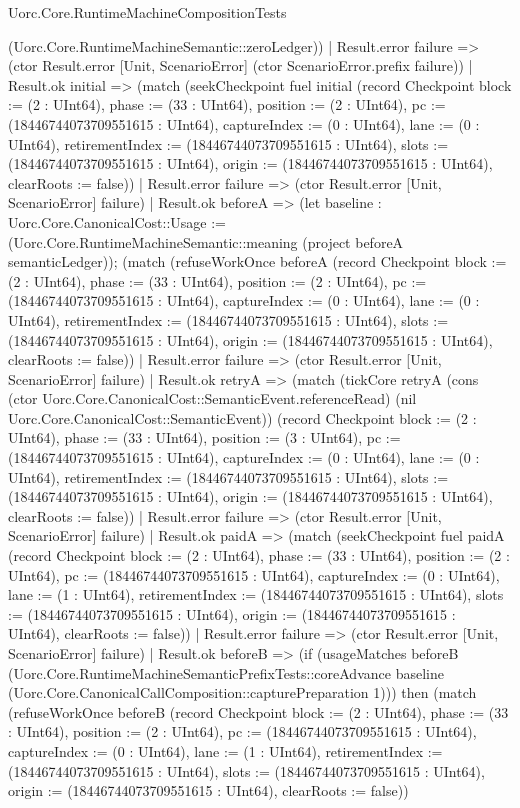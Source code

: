 \begin{lexlean}{Uorc.Core.RuntimeMachineCompositionTests}
\begin{semanticmodule}
{(Uorc.Core.RuntimeMachineSemantic::zeroLedger))
    | Result.error failure => (ctor Result.error [Unit, ScenarioError] (ctor ScenarioError.prefix failure))
    | Result.ok initial => (match (seekCheckpoint fuel initial (record Checkpoint {block := (2 : UInt64), phase := (33 : UInt64), position := (2 : UInt64), pc := (18446744073709551615 : UInt64), captureIndex := (0 : UInt64), lane := (0 : UInt64), retirementIndex := (18446744073709551615 : UInt64), slots := (18446744073709551615 : UInt64), origin := (18446744073709551615 : UInt64), clearRoots := false}))
      | Result.error failure => (ctor Result.error [Unit, ScenarioError] failure)
      | Result.ok beforeA => (let baseline : Uorc.Core.CanonicalCost::Usage := (Uorc.Core.RuntimeMachineSemantic::meaning (project beforeA semanticLedger)); (match (refuseWorkOnce beforeA (record Checkpoint {block := (2 : UInt64), phase := (33 : UInt64), position := (2 : UInt64), pc := (18446744073709551615 : UInt64), captureIndex := (0 : UInt64), lane := (0 : UInt64), retirementIndex := (18446744073709551615 : UInt64), slots := (18446744073709551615 : UInt64), origin := (18446744073709551615 : UInt64), clearRoots := false}))
        | Result.error failure => (ctor Result.error [Unit, ScenarioError] failure)
        | Result.ok retryA => (match (tickCore retryA (cons (ctor Uorc.Core.CanonicalCost::SemanticEvent.referenceRead) (nil Uorc.Core.CanonicalCost::SemanticEvent)) (record Checkpoint {block := (2 : UInt64), phase := (33 : UInt64), position := (3 : UInt64), pc := (18446744073709551615 : UInt64), captureIndex := (0 : UInt64), lane := (0 : UInt64), retirementIndex := (18446744073709551615 : UInt64), slots := (18446744073709551615 : UInt64), origin := (18446744073709551615 : UInt64), clearRoots := false}))
          | Result.error failure => (ctor Result.error [Unit, ScenarioError] failure)
          | Result.ok paidA => (match (seekCheckpoint fuel paidA (record Checkpoint {block := (2 : UInt64), phase := (33 : UInt64), position := (2 : UInt64), pc := (18446744073709551615 : UInt64), captureIndex := (0 : UInt64), lane := (1 : UInt64), retirementIndex := (18446744073709551615 : UInt64), slots := (18446744073709551615 : UInt64), origin := (18446744073709551615 : UInt64), clearRoots := false}))
            | Result.error failure => (ctor Result.error [Unit, ScenarioError] failure)
            | Result.ok beforeB => (if (usageMatches beforeB (Uorc.Core.RuntimeMachineSemanticPrefixTests::coreAdvance baseline (Uorc.Core.CanonicalCallComposition::capturePreparation 1))) then (match (refuseWorkOnce beforeB (record Checkpoint {block := (2 : UInt64), phase := (33 : UInt64), position := (2 : UInt64), pc := (18446744073709551615 : UInt64), captureIndex := (0 : UInt64), lane := (1 : UInt64), retirementIndex := (18446744073709551615 : UInt64), slots := (18446744073709551615 : UInt64), origin := (18446744073709551615 : UInt64), clearRoots := false}))
}
\end{semanticmodule}
\end{lexlean}
